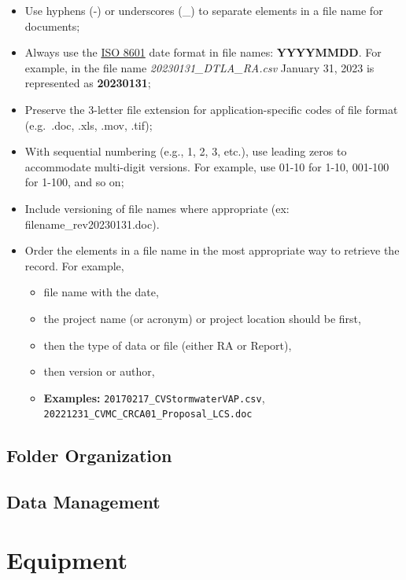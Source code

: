 \documentclass[
]{book}
\providecommand{\tightlist}{%
  \setlength{\itemsep}{0pt}\setlength{\parskip}{0pt}}
\begin{document}
\begin{itemize}
\item
  Use hyphens (-) or underscores (\_) to separate elements in a file name for documents;
\item
  Always use the \href{https://www.iso.org/iso-8601-date-and-time-format.html}{ISO 8601} date format in file names: \textbf{YYYYMMDD}. For example, in the file name \emph{20230131\_DTLA\_RA.csv} January 31, 2023 is represented as \textbf{20230131};
\item
  Preserve the 3-letter file extension for application-specific codes of file format (e.g.~.doc, .xls, .mov, .tif);
\item
  With sequential numbering (e.g., 1, 2, 3, etc.), use leading zeros to accommodate multi-digit versions. For example, use 01-10 for 1-10, 001-100 for 1-100, and so on;
\item
  Include versioning of file names where appropriate (ex: filename\_rev20230131.doc).
\item
  Order the elements in a file name in the most appropriate way to retrieve the record. For example,

  \begin{itemize}
  \tightlist
  \item
    file name with the date,
  \item
    the project name (or acronym) or project location should be first,
  \item
    then the type of data or file (either RA or Report),
  \item
    then version or author,
  \item
    \textbf{Examples:} \texttt{20170217\_CVStormwaterVAP.csv}, \texttt{20221231\_CVMC\_CRCA01\_Proposal\_LCS.doc}
  \end{itemize}
\end{itemize}

\hypertarget{folder-organization}{%
\section{Folder Organization}\label{folder-organization}}

\hypertarget{data-management}{%
\section{Data Management}\label{data-management}}

\hypertarget{equipment}{%
\chapter{Equipment}\label{equipment}}
\end{document}
